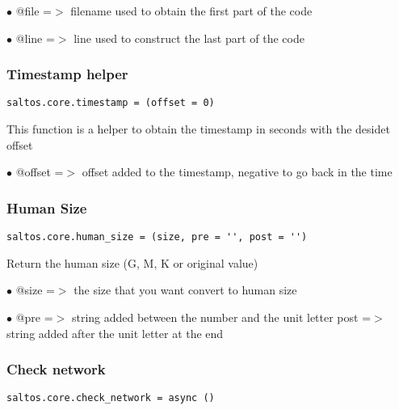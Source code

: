 \documentclass[a4paper]{article}
\begin{document}
\begin{compactitem}
\item[\color{myblue}$\bullet$] @file =$>$ filename used to obtain the first part of the code
\item[\color{myblue}$\bullet$] @line =$>$ line used to construct the last part of the code
\end{compactitem}

\hypertarget{toc719}{}
\subsubsection{Timestamp helper}

\begin{lstlisting}
saltos.core.timestamp = (offset = 0)
\end{lstlisting}

This function is a helper to obtain the timestamp in seconds with the desidet offset

\begin{compactitem}
\item[\color{myblue}$\bullet$] @offset =$>$ offset added to the timestamp, negative to go back in the time
\end{compactitem}

\hypertarget{toc720}{}
\subsubsection{Human Size}

\begin{lstlisting}
saltos.core.human_size = (size, pre = '', post = '')
\end{lstlisting}

Return the human size (G, M, K or original value)

\begin{compactitem}
\item[\color{myblue}$\bullet$] @size  =$>$ the size that you want convert to human size
\item[\color{myblue}$\bullet$] @pre  =$>$ string added between the number and the unit letter
post  =$>$ string added after the unit letter at the end
\end{compactitem}

\hypertarget{toc721}{}
\subsubsection{Check network}

\begin{lstlisting}
saltos.core.check_network = async ()
\end{lstlisting}
\end{document}
